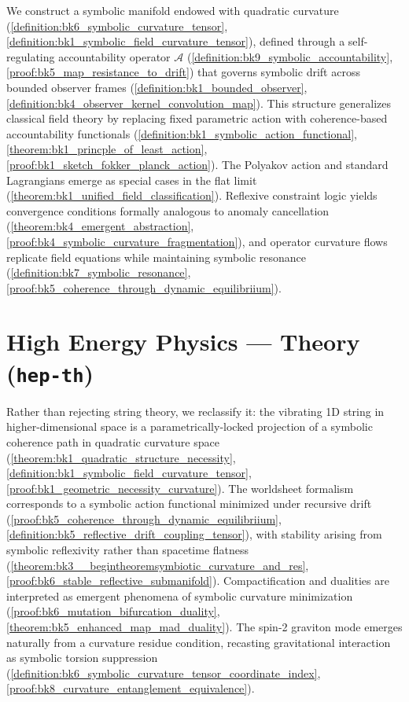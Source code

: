 We construct a symbolic manifold endowed with quadratic curvature (\ref{definition:bk6_symbolic_curvature_tensor}, \ref{definition:bk1_symbolic_field_curvature_tensor}), defined through a self-regulating accountability operator $\mathcal{A}$ (\ref{definition:bk9_symbolic_accountability}, \ref{proof:bk5_map_resistance_to_drift}) that governs symbolic drift across bounded observer frames (\ref{definition:bk1_bounded_observer}, \ref{definition:bk4_observer_kernel_convolution_map}). This structure generalizes classical field theory by replacing fixed parametric action with coherence-based accountability functionals (\ref{definition:bk1_symbolic_action_functional}, \ref{theorem:bk1_princple_of_least_action}, \ref{proof:bk1_sketch_fokker_planck_action}). The Polyakov action and standard Lagrangians emerge as special cases in the flat limit (\ref{theorem:bk1_unified_field_classification}). Reflexive constraint logic yields convergence conditions formally analogous to anomaly cancellation (\ref{theorem:bk4_emergent_abstraction}, \ref{proof:bk4_symbolic_curvature_fragmentation}), and operator curvature flows replicate field equations while maintaining symbolic resonance (\ref{definition:bk7_symbolic_resonance}, \ref{proof:bk5_coherence_through_dynamic_equilibriium}).

\section*{High Energy Physics — Theory (\texttt{hep-th})}
\label{abs:hep}

Rather than rejecting string theory, we reclassify it: the vibrating 1D string in higher-dimensional space is a parametrically-locked projection of a symbolic coherence path in quadratic curvature space (\ref{theorem:bk1_quadratic_structure_necessity}, \ref{definition:bk1_symbolic_field_curvature_tensor}, \ref{proof:bk1_geometric_necessity_curvature}). The worldsheet formalism corresponds to a symbolic action functional minimized under recursive drift (\ref{proof:bk5_coherence_through_dynamic_equilibriium}, \ref{definition:bk5_reflective_drift_coupling_tensor}), with stability arising from symbolic reflexivity rather than spacetime flatness (\ref{theorem:bk3__begintheoremsymbiotic_curvature_and_res}, \ref{proof:bk6_stable_reflective_submanifold}). Compactification and dualities are interpreted as emergent phenomena of symbolic curvature minimization (\ref{proof:bk6_mutation_bifurcation_duality}, \ref{theorem:bk5_enhanced_map_mad_duality}). The spin-2 graviton mode emerges naturally from a curvature residue condition, recasting gravitational interaction as symbolic torsion suppression (\ref{definition:bk6_symbolic_curvature_tensor_coordinate_index}, \ref{proof:bk8_curvature_entanglement_equivalence}).

